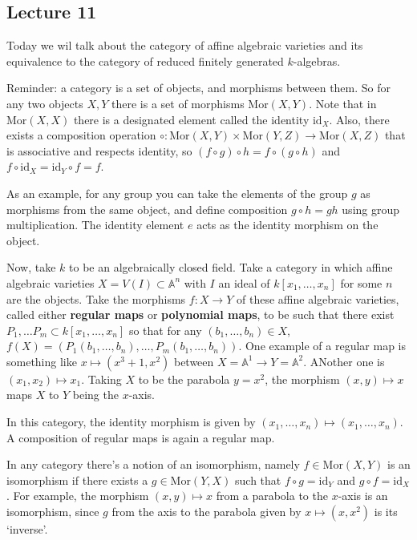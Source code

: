 \documentclass[12pt]{article}
\newcommand{\A}{\mathbb{A}}
\newcommand{\Mor}{\mathrm{Mor}}
\newcommand{\id}{\mathrm{id}}
\begin{document}
    \subsection{Lecture 11}
    Today we wil talk about the category of affine algebraic varieties and its equivalence to the category of reduced finitely generated $k$-algebras. \par
    Reminder: a category is a set of objects, and morphisms between them. So for any two objects $X, Y$ there is a set of morphisms $\Mor(X, Y)$. Note that in $\Mor(X, X)$ there is a designated element called the identity $\id_X$. Also, there exists a composition operation $\circ: \Mor(X, Y) \times \Mor(Y, Z) \to \Mor(X, Z)$ that is associative and respects identity, so $(f \circ g) \circ h = f \circ(g \circ h)$ and $f \circ \id_X = \id_Y \circ f = f$. \par
    As an example, for any group you can take the elements of the group $g$ as morphisms from the same object, and define composition $g \circ h = gh$ using group multiplication. The identity element $e$ acts as the identity morphism on the object. \par
    Now, take $k$ to be an algebraically closed field. Take a category in which affine algebraic varieties $X = V(I) \subset \A^n$ with $I$ an ideal of $k[x_1,\dots, x_n]$ for some $n$ are the objects. Take the morphisms $f: X \to Y$ of these affine algebraic varieties, called either \textbf{regular maps} or \textbf{polynomial maps}, to be such that there exist $P_1, \dots P_m \subset k[x_1, \dots, x_n]$ so that for any $(b_1, \dots, b_n) \in X$, $f(X) = (P_1(b_1, \dots, b_n), \dots, P_m(b_1, \dots, b_n))$. One example of a regular map is something like $x \mapsto (x^3 + 1, x^2)$ between $X = \A^1 \to Y = \A^2$. ANother one is $(x_1, x_2) \mapsto x_1$. Taking $X$ to be the parabola $y = x^2$, the morphism $(x, y) \mapsto x$ maps $X$ to $Y$ being the $x$-axis. \par
    In this category, the identity morphism is given by $(x_1, \dots, x_n) \mapsto (x_1, \dots, x_n)$. A composition of regular maps is again a regular map. \par
    In any category there's a notion of an isomorphism, namely $f \in \Mor(X, Y)$ is an isomorphism if there exists a $g \in \Mor(Y, X)$ such that $f \circ g = \id_Y$ and $g \circ f = \id_X$. For example, the morphism $(x, y) \mapsto x$ from a parabola to the $x$-axis is an isomorphism, since $g$ from the axis to the parabola given by $x \mapsto (x, x^2)$ is its `inverse'. \par
\end{document}
